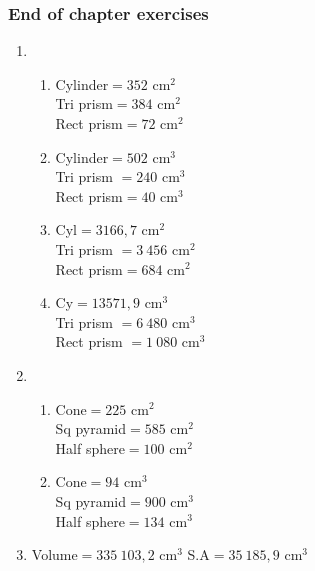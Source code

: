 {\begin{multicols}{3}
\subsubsection*{End of chapter exercises} %
\begin{enumerate}[noitemsep, label=\textbf{\arabic*}. ] 
\item %
      \begin{enumerate}[noitemsep, label=\textbf{(\alph*)} ]
	  \item Cylinder$ = 352$ cm$^2$\\  Tri prism$= 384$ cm$^2$\\Rect prism$ = 72$ cm$^2$%
	  \item Cylinder$ = 502$ cm$^3$\\ Tri prism $= 240$ cm$^3$\\Rect prism$ = 40$ cm$^3$ %
\item Cyl$=3166,7$ cm$^2$\\ Tri prism $=3~456$ cm$^2$\\Rect prism$=684$ cm$^2$%
\item Cy$=13571,9$ cm$^3$\\ Tri prism $=6~480$ cm$^3$\\Rect prism $=1~080$ cm$^3$ %
      \end{enumerate}
\item %
      \begin{enumerate}[noitemsep, label=\textbf{(\alph*)} ]
	  \item Cone$= 225$ cm$^2$\\Sq pyramid$= 585$ cm$^2$\\Half sphere$= 100$ cm$^2$%
	  \item Cone$ = 94$ cm$^3$\\Sq pyramid$= 900$ cm$^3$ \\Half sphere$= 134$ cm$^3$ %
      \end{enumerate}
\item Volume$=335~103,2$ cm$^3$ S.A$=35~185,9$ cm$^3$%
\end{enumerate}
\end{multicols}

}
